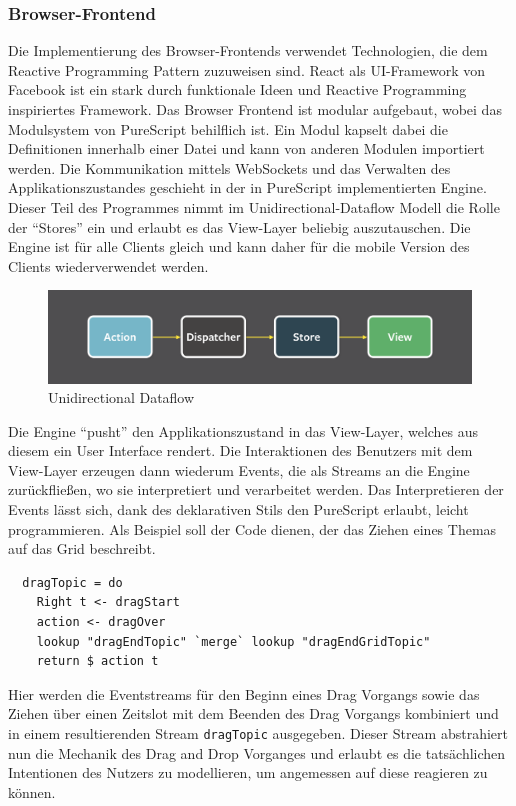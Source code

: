 \subsubsection{Browser-Frontend}
Die Implementierung des Browser-Frontends verwendet Technologien, die
dem \gls{Reactive Programming} Pattern zuzuweisen sind. \gls{React} als
UI-Framework von Facebook ist ein stark durch funktionale Ideen und
\gls{Reactive Programming} inspiriertes Framework. Das Browser
Frontend ist modular aufgebaut, wobei das Modulsystem von
\gls{PureScript} behilflich ist. Ein Modul kapselt dabei die Definitionen innerhalb
einer Datei und kann von anderen Modulen importiert werden. Die
Kommunikation mittels WebSockets und das Verwalten des
Applikationszustandes geschieht in der in \gls{PureScript} implementierten
Engine. Dieser Teil des Programmes nimmt im Unidirectional-Dataflow
Modell die Rolle der ``Stores'' ein und erlaubt es das View-Layer
beliebig auszutauschen. Die Engine ist für alle Clients gleich und
kann daher für die mobile Version des Clients wiederverwendet werden.
\begin{figure}[h]
\includegraphics[scale=0.3]{img/Unidirectional.png}
\caption{Unidirectional Dataflow}
\end{figure}

\noindent Die Engine ``pusht'' den Applikationszustand in das
View-Layer, welches aus diesem ein User Interface rendert.
Die Interaktionen des Benutzers mit dem View-Layer erzeugen dann
wiederum Events, die als Streams an die Engine zurückfließen, wo sie
interpretiert und verarbeitet werden. Das Interpretieren der Events
lässt sich, dank des deklarativen Stils den PureScript erlaubt, leicht
programmieren. Als Beispiel soll der Code dienen, der das Ziehen eines
Themas auf das Grid beschreibt.

\begin{lstlisting}
  dragTopic = do
    Right t <- dragStart
    action <- dragOver
    lookup "dragEndTopic" `merge` lookup "dragEndGridTopic"
    return $ action t
\end{lstlisting}
\noindent Hier werden die Eventstreams für den Beginn eines
Drag Vorgangs sowie das Ziehen über einen Zeitslot mit dem Beenden des
Drag Vorgangs kombiniert und in einem resultierenden Stream \texttt{dragTopic}
ausgegeben. Dieser Stream abstrahiert nun die Mechanik des Drag and
Drop Vorganges und erlaubt es die tatsächlichen Intentionen des
Nutzers zu modellieren, um angemessen auf diese reagieren zu können.

